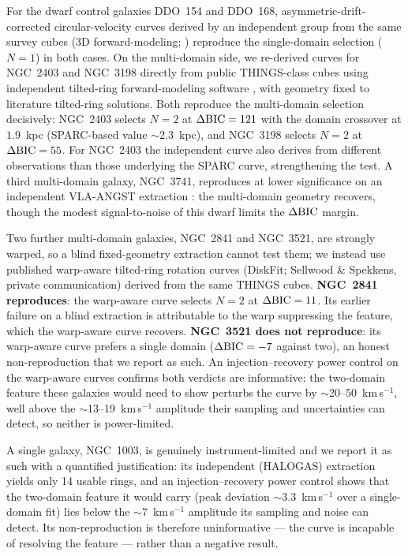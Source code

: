 \documentclass[twocolumn]{aastex701}
\newcommand{\dbic}{\Delta{\rm BIC}}
\begin{document}
For the dwarf control galaxies DDO~154 and DDO~168, asymmetric-drift-corrected
circular-velocity curves derived by an independent group from the same survey
cubes (3D forward-modeling; \citealt{Iorio2017}) reproduce the single-domain
selection ($N=1$) in both cases. On the multi-domain side, we re-derived curves
for NGC~2403 and NGC~3198 directly from public THINGS-class cubes using
independent tilted-ring forward-modeling software
\citep[\textsuperscript{3D}Barolo;][]{DiTeodoro2015}, with geometry fixed to
literature tilted-ring solutions. Both reproduce the multi-domain selection
decisively: NGC~2403 selects $N=2$ at $\dbic = 121$ with the domain crossover at
$1.9$~kpc (SPARC-based value $\sim 2.3$~kpc), and NGC~3198 selects $N=2$ at
$\dbic = 55$. For NGC~2403 the independent curve also derives from different
observations than those underlying the SPARC curve, strengthening the test. A
third multi-domain galaxy, NGC~3741, reproduces at lower significance on an
independent VLA-ANGST extraction \citep[different telescope from the
WSRT-based SPARC curve;][]{Walter2008}: the multi-domain geometry recovers,
though the modest signal-to-noise of this dwarf limits the $\dbic$ margin.

Two further multi-domain galaxies, NGC~2841 and NGC~3521, are strongly warped,
so a blind fixed-geometry extraction cannot test them; we instead use published
warp-aware tilted-ring rotation curves (DiskFit; Sellwood \& Spekkens, private
communication) derived from the same THINGS cubes. \textbf{NGC~2841
reproduces}: the warp-aware curve selects $N=2$ at $\dbic = 11$. Its earlier
failure on a blind extraction is attributable to the warp suppressing the
feature, which the warp-aware curve recovers. \textbf{NGC~3521 does not
reproduce}: its warp-aware curve prefers a single domain ($\dbic = -7$ against
two), an honest non-reproduction that we report as such. An injection--recovery
power control on the warp-aware curves confirms both verdicts are informative:
the two-domain feature these galaxies would need to show perturbs the curve by
$\sim$20--50~km\,s$^{-1}$, well above the $\sim$13--19~km\,s$^{-1}$ amplitude
their sampling and uncertainties can detect, so neither is power-limited.

A single galaxy, NGC~1003, is genuinely instrument-limited and we report it as
such with a quantified justification: its independent (HALOGAS) extraction
yields only 14 usable rings, and an injection--recovery power control shows that
the two-domain feature it would carry (peak deviation $\sim$3.3~km\,s$^{-1}$
over a single-domain fit) lies below the $\sim$7~km\,s$^{-1}$ amplitude its
sampling and noise can detect. Its non-reproduction is therefore uninformative
--- the curve is incapable of resolving the feature --- rather than a negative
result.
\end{document}
